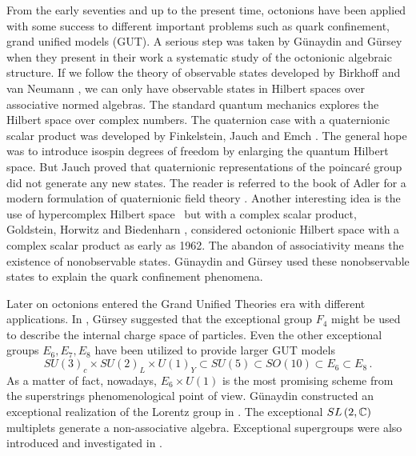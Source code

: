 \documentclass[a4paper,12pt]{book}
\begin{document}
From the early seventies and up to the present time, octonions have been
applied with some success to different important problems such as quark
confinement, grand unified models (GUT). A serious step was taken by
G\"{u}naydin and G\"{u}rsey \cite{c10}\cite{c10a} when they present in their
work a systematic study of the octonionic algebraic structure. If we follow
the theory of observable states developed by Birkhoff and van Neumann \cite
{c11}, we can only have observable states in Hilbert spaces over associative
normed algebras. The standard quantum mechanics explores the Hilbert space
over complex numbers. The quaternion case with a quaternionic scalar product
was developed by Finkelstein, Jauch and Emch \cite{c12}. The general hope
was to introduce isospin degrees of freedom by enlarging the quantum Hilbert
space. But Jauch proved that quaternionic representations of the
poincar\'{e} group did not generate any new states. The reader is referred
to the book of Adler for a modern formulation of quaternionic field theory 
\cite{adler}. Another interesting idea is the use of hypercomplex Hilbert
space \ but with a complex scalar product, Goldstein, Horwitz and Biedenharn 
\cite{c13}, considered octonionic Hilbert space with a complex scalar
product as early as 1962. The abandon of associativity means the existence
of nonobservable states. G\"{u}naydin and G\"{u}rsey used these
nonobservable states to explain the quark confinement phenomena.

Later on octonions entered the Grand Unified Theories era with different
applications. In \cite{c14}, G\"{u}rsey suggested that the exceptional group 
$F_{4}$ might be used to describe the internal charge space of particles.
Even the other exceptional groups $E_{6},E_{7},E_{8}$ have been utilized to
provide larger GUT models \cite{e6e7} 
\begin{equation}
SU(3)_{c}\times SU(2)_{L}\times U(1)_{Y}\subset SU(5)\subset SO(10)\subset
E_{6}\subset E_{8}\,.
\end{equation}
As a matter of fact, nowadays, $E_{6}\times U\left( 1\right) $ is the most
promising scheme from the superstrings phenomenological point of view.
G\"{u}naydin constructed an exceptional realization of the Lorentz group in 
\cite{c15}. The exceptional $SL\left( 2,\Bbb{C}\right) $ multiplets generate
a non-associative algebra. Exceptional supergroups were also introduced and
investigated in \cite{c15}.
\end{document}
